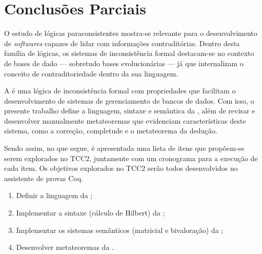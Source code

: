 \chapter{Conclusões Parciais}\label{chap:conclusao}

O estudo de lógicas paraconsistentes mostra-se relevante para o desenvolvimento de \textit{softwares} capazes de lidar com informações contraditórias. Dentro desta família de lógicas, os sistemas de inconsistência formal destacam-se no contexto de bases de dado {---} sobretudo bases evolucionárias {---} já que internalizam o conceito de contraditoriedade dentro da sua linguagem.

A \lfium{} é uma lógica de inconsistência formal com propriedades que facilitam o desenvolvimento de sistemas de gerenciamento de bancos de dados. Com isso, o presente trabalho define a linguagem, sintaxe e semântica da \lfium{}, além de revisar e desenvolver manualmente metateoremas que evidenciam características deste sistema, como a correção, completude e o metateorema da dedução.

Sendo assim, no que segue, é apresentada uma lista de itens que propõem-se serem explorados no TCC2, juntamente com um cronograma para a execução de cada item. Os objetivos explorados no TCC2 serão todos desenvolvidos no assistente de provas Coq.

\begin{enumerate}
    \item Definir a linguagem da \lfium{};
    \item Implementar a sintaxe (cálculo de Hilbert) da \lfium{};
    \item Implementar os sistemas semânticos (matricial e bivaloração) da \lfium{};
    \item Desenvolver metateoremas da \lfium{}.
\end{enumerate}


